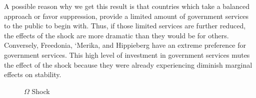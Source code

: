 \documentclass[12pt]{article}
\begin{document}
\begin{spacing}{1.5}
A possible reason why we get this result is that countries which take a balanced approach or favor suppression, provide a limited amount of government services to the public to begin with. Thus, if those limited services are further reduced, the effects of the shock are more dramatic than they would be for others. Conversely, Freedonia, `Merika, and Hippieberg have an extreme preference for government services. This high level of investment in government services mutes the effect of the shock because they were already experiencing diminish marginal effects on stability. 

 
\begin{figure}
\centering
{} 
\caption{$\Omega$ Shock}


\end{figure}
\end{spacing}
\end{document}
